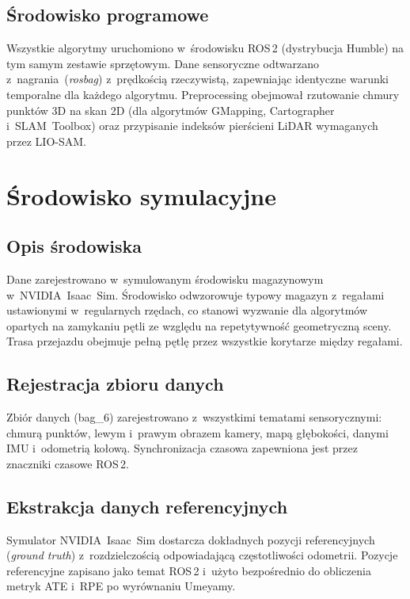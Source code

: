 \subsection{Środowisko programowe}

Wszystkie algorytmy uruchomiono w~środowisku ROS\,2 (dystrybucja Humble)
na tym samym zestawie sprzętowym.
Dane sensoryczne odtwarzano z~nagrania~(\textit{rosbag}) z~prędkością
rzeczywistą, zapewniając identyczne warunki temporalne dla każdego algorytmu.
Preprocessing obejmował rzutowanie chmury punktów 3D na skan 2D (dla algorytmów
GMapping, Cartographer i~SLAM~Toolbox) oraz przypisanie indeksów pierścieni
LiDAR wymaganych przez LIO-SAM.

\section{Środowisko symulacyjne}

\subsection{Opis środowiska}

Dane zarejestrowano w~symulowanym środowisku magazynowym w~NVIDIA~Isaac~Sim.
Środowisko odwzorowuje typowy magazyn z~regałami ustawionymi w~regularnych rzędach,
co stanowi wyzwanie dla algorytmów opartych na zamykaniu pętli ze względu na
repetytywność geometryczną sceny.
Trasa przejazdu obejmuje pełną pętlę przez wszystkie korytarze między regałami.

\subsection{Rejestracja zbioru danych}

Zbiór danych (bag\_6) zarejestrowano z~wszystkimi tematami sensorycznymi:
chmurą punktów, lewym i~prawym obrazem kamery, mapą głębokości, danymi IMU
i~odometrią kołową.
Synchronizacja czasowa zapewniona jest przez znaczniki czasowe ROS\,2.

\subsection{Ekstrakcja danych referencyjnych}

Symulator NVIDIA~Isaac~Sim dostarcza dokładnych pozycji referencyjnych
(\textit{ground truth}) z~rozdzielczością odpowiadającą częstotliwości
odometrii.
Pozycje referencyjne zapisano jako temat ROS\,2 i~użyto bezpośrednio do obliczenia
metryk ATE i~RPE po wyrównaniu Umeyamy.

